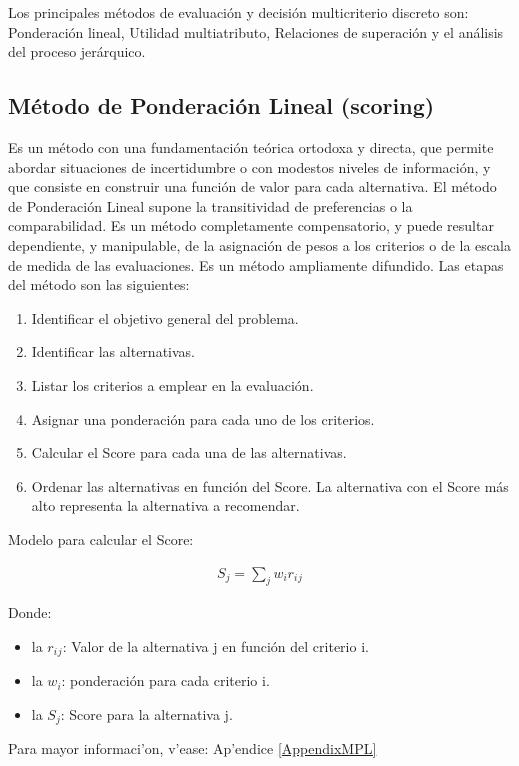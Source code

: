Los principales m\'etodos de evaluaci\'on y decisi\'on multicriterio discreto son: Ponderaci\'on lineal, Utilidad multiatributo, Relaciones de superaci\'on y el an\'alisis del proceso jer\'arquico.\cite{Hurtado2005}

\subsection{M\'etodo de Ponderaci\'on Lineal (scoring)}
Es un m\'etodo con una fundamentaci\'on te\'orica ortodoxa y directa, que permite abordar situaciones de incertidumbre o con modestos niveles de informaci\'on, y que consiste en construir una funci\'on de valor para cada alternativa. El m\'etodo de Ponderaci\'on Lineal supone la transitividad de preferencias o la comparabilidad. Es un m\'etodo completamente compensatorio, y puede resultar dependiente, y manipulable, de la asignaci\'on de pesos a los criterios o de la escala de medida de las evaluaciones. Es un m\'etodo ampliamente difundido.
Las etapas del m\'etodo son las siguientes:
\begin{enumerate}
\item Identificar el objetivo general del problema.
\item Identificar las alternativas.
\item Listar los criterios a emplear en la evaluaci\'on.
\item Asignar una ponderaci\'on para cada uno de los criterios.
\item Calcular el Score para cada una de las alternativas.
\item Ordenar las alternativas en funci\'on del Score. La alternativa con el Score m\'as alto representa la alternativa a recomendar.
\end{enumerate}

Modelo para calcular el Score:

\begin{eqnarray}
	S_j=\sum_{j}w_ir_i{}_j  
\end{eqnarray} 

Donde:
\begin{itemize}
\item la $r_i{}_j$: Valor de la alternativa j en funci\'on del criterio i.
\item la $w_i$: ponderaci\'on para cada criterio i.
\item la $S_j$: Score para la alternativa j.
\end{itemize}

Para mayor informaci'on, v'ease: Ap'endice \ref{AppendixMPL}


